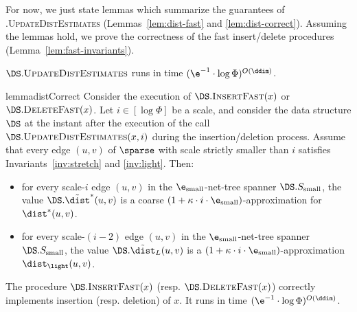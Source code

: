For now, we just state lemmas which summarize the guarantees of \DS.\textsc{UpdateDistEstimates} (Lemmas~\ref{lem:dist-fast} and \ref{lem:dist-correct}). Assuming the lemmas hold, we prove the correctness of the fast insert/delete procedures (Lemma~\ref{lem:fast-invariants}).
\begin{lemma}
    \label{lem:dist-fast}
    $\DS.\textsc{UpdateDistEstimates}$ runs in time $(\e^{-1} \cdot  \log \Phi)^{O(\ddim)}$.
\end{lemma}
\begin{restatable}{lemma}{distCorrect}
\label{lem:dist-correct}
    Consider the execution of $\DS.\textsc{InsertFast}(x)$ or $\DS.\textsc{DeleteFast}(x)$.
    Let $i\in [\log \Phi]$ be a scale, and consider the data structure $\DS$ at the instant after the execution of the call $\DS.\textsc{UpdateDistEstimates}(x,i)$ during the insertion/deletion process. Assume that every edge $(u,v)$ of $\sparse$ with scale strictly smaller than $i$ satisfies Invariants~\ref{inv:stretch} and \ref{inv:light}. Then:
    \begin{itemize}
        \item for every scale-$i$ edge $(u,v)$ in the $\e_{\rm small}$-net-tree spanner $\DS.S_{\rm small}$,
        the value $\DS.\tilde \dist^*(u,v)$ is a
        coarse $(1 + \kappa \cdot i \cdot \e_{\rm small})$-approximation for $\dist^*(u,v)$.
        \item for every scale-$(i-2)$ edge $(u,v)$ in the $\e_{\rm small}$-net-tree spanner $\DS.S_{\rm small}$, the value $\DS.\tilde \dist_L(u,v)$ is a $(1 + \kappa \cdot i \cdot \e_{\rm small})$-approximation $\dist_\light(u,v)$.
    \end{itemize}
\end{restatable}
%
\begin{lemma}
\label{lem:fast-invariants}
    The procedure $\DS.\textsc{InsertFast}(x)$ (resp. $\DS.\textsc{DeleteFast}(x)$) correctly implements insertion (resp. deletion) of $x$. It runs in time $(\e^{-1}\cdot \log \Phi)^{O(\ddim)}$.
\end{lemma}
